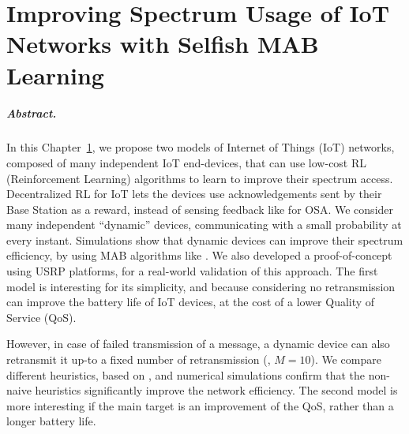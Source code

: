 
\chapter{Improving Spectrum Usage of IoT Networks with Selfish MAB Learning}
\label{chapter:4}

\graphicspath{{2-Chapters/4-Chapter/Images/}}


\paragraph{Abstract.}
%
In this Chapter~\ref{chapter:4}, we propose two models of Internet of Things (IoT) networks, composed of many independent IoT end-devices,
that can use low-cost RL (Reinforcement Learning) algorithms to learn to improve their spectrum access.
%
Decentralized RL for IoT lets the devices use acknowledgements sent by their Base Station as a reward, instead of sensing feedback like for OSA.
We consider many independent ``dynamic'' devices, communicating with a small probability at every instant.
Simulations show that dynamic devices can improve their spectrum efficiency,
by using MAB algorithms like \UCB.
We also developed a proof-of-concept using USRP platforms, for a real-world validation of this approach.
%
The first model
is interesting for its simplicity,
and because considering no retransmission can improve the battery life of IoT devices, at the cost of a lower Quality of Service (QoS).

However, in case of failed transmission of a message, a dynamic device can also retransmit it up-to a fixed number of retransmission (\eg, $M=10$).
We compare different heuristics, based on \UCB, and numerical simulations confirm that the non-naive heuristics significantly improve the network efficiency.
%
The second model is more interesting if the main target is an improvement of the QoS, rather than a longer battery life.

